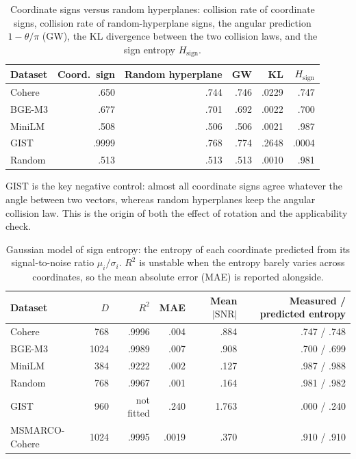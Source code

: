 \begin{table}[tbp]
\centering


\small
\begin{tabular}{lrrrrr}
\toprule
Dataset & Coord.\ sign & Random hyperplane & GW & KL & $H_{\mathrm{sign}}$ \\
\midrule
Cohere & .650 & .744 & .746 & .0229 & .747 \\
BGE-M3 & .677 & .701 & .692 & .0022 & .700 \\
MiniLM & .508 & .506 & .506 & .0021 & .987 \\
GIST & .9999 & .768 & .774 & .2648 & .0004 \\
Random & .513 & .513 & .513 & .0010 & .981 \\
\bottomrule
\end{tabular}

\small
\caption{Coordinate signs versus random hyperplanes: collision rate of coordinate signs, collision rate of random-hyperplane signs, the angular prediction $1-\theta/\pi$ (GW), the KL divergence between the two collision laws, and the sign entropy $H_{\mathrm{sign}}$.}
\label{tab:app-foundational-sign}
\end{table}

GIST is the key negative control: almost all coordinate signs agree whatever the angle between two vectors, whereas random hyperplanes keep the angular collision law. This is the origin of both the effect of rotation and the applicability check.

\begin{table}[tbp]
\centering


\small
\begin{tabular}{lrrrrr}
\toprule
Dataset & $D$ & $R^2$ & MAE & Mean $|\mathrm{SNR}|$ & Measured / predicted entropy \\
\midrule
Cohere & 768 & .9996 & .004 & .884 & .747 / .748 \\
BGE-M3 & 1024 & .9989 & .007 & .908 & .700 / .699 \\
MiniLM & 384 & .9222 & .002 & .127 & .987 / .988 \\
Random & 768 & .9967 & .001 & .164 & .981 / .982 \\
GIST & 960 & not fitted & .240 & 1.763 & .000 / .240 \\
MSMARCO-Cohere & 1024 & .9995 & .0019 & .370 & .910 / .910 \\
\bottomrule
\end{tabular}

\small
\caption{Gaussian model of sign entropy: the entropy of each coordinate predicted from its signal-to-noise ratio $\mu_i/\sigma_i$. $R^2$ is unstable when the entropy barely varies across coordinates, so the mean absolute error (MAE) is reported alongside.}
\label{tab:app-foundational-gaussian}
\end{table}

